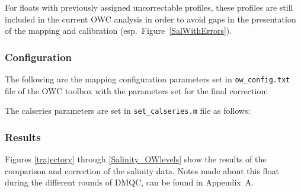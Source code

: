 \documentclass{article}
\begin{document}
For floats with previously assigned uncorrectable profiles,
these profiles are still included in the current OWC analysis
in order to avoid gaps in the presentation of the mapping and
calibration (esp.\ Figure~\ref{SalWithErrors}). 

\subsubsection{Configuration}\label{Configuration1}
%  
The following are the mapping configuration parameters set in
\texttt{ow\_config.txt} file of the OWC toolbox with the parameters set
for the final correction:  

The calseries parameters are set in \texttt{set\_calseries.m} file as
follows: 


\subsubsection{Results}\label{results_CTDArgo}
Figures \ref{trajectory} through \ref{Salinity_OWlevels} show the results
of the comparison and correction of the salinity data.
%
Notes made about this float during the different rounds of DMQC, can be
found in Appendix~A.
\end{document}
